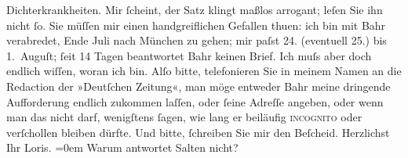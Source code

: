 \begin{ledgroupsized}[t]{13cm}
               Dichterkrankheiten.\pend
           \pstart
           Mir ſcheint, der Satz klingt maßlos arrogant; leſen Sie ihn nicht ſo.\pend
           \pstart
           Sie müſſen mir einen handgreiflichen Gefallen thuen: ich bin mit Bahr verabredet, Ende Juli nach München zu gehen; mir paſst 24.
               (eventuell 25.) bis 1. Auguſt; ſeit 14 Tagen beantwortet
                  Bahr keinen Brief. Ich muſs aber doch
               endlich wiſſen, {\pb}woran ich bin.
               Alſo bitte, telefonieren Sie in meinem Namen an die Redaction der »Deutſchen Zeitung«, man möge entweder Bahr meine dringende Aufforderung endlich zukommen laſſen, oder
               ſeine Adreſſe angeben, oder wenn man das nicht darf, wenigſtens ſagen, wie lang er
               beiläufig \textsc{incognito} oder verſchollen bleiben dürfte. Und
               bitte, ſchreiben Sie mir  den Beſcheid.\pend
           \pstart
           Herzlichst{\\[\baselineskip]}Ihr \spacefill\mbox{Loris.}\pend
           \leftskip=0em{}\pstart
           \noindent{}Warum antwortet Salten nicht?\pend
           
         
         \endnumbering{}\end{ledgroupsized}  \newcommand{\dateiname}{L00238}\newcommand{\titel}{Hugo von Hofmannsthal an Arthur Schnitzler, 19. 7. 1893}\newcommand{\editorInnen}{ Martin Anton Müller und Gerd-Hermann Susen}
      